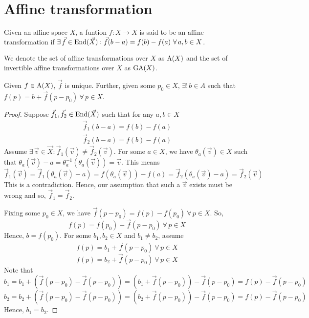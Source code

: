 \section{Affine transformation}

\begin{definition}
    Given an affine space $X$, a funtion $f: X \to X$ is said to be an affine
    transformation if $\exists\,\vec{f}\in\operatorname{End}(\vec{X}): \vec{f}(b-a)=f(b)-f(a)\ \forall\,a,b \in X$.
\end{definition}

\begin{notation}
    We denote the set of affine transformations over $X$ as $\operatorname{A}(X)$ and the set of
    invertible affine transformations over $X$ as $\operatorname{GA}(X)$.
\end{notation}

\begin{theorem} \label{thm:aff_lin_rep}
    Given $f\in\operatorname{A}(X)$, $\vec{f}$ is unique. Further, given some $p_0 \in X$,
    $\exists!\,b\in{A}$ such that $f(p)=b+\vec{f}(p-p_0)\ \forall\,p \in X$.
\end{theorem}

\begin{proof}
    Suppose $\vec{f}_1,\vec{f}_2\in\operatorname{End}(\vec{X})$ such that for any $a,b \in X$
    \begin{align*}
        \vec{f}_1(b-a)=f(b)-f(a) \\
        \vec{f}_2(b-a)=f(b)-f(a)
    \end{align*}
    Assume $\exists\,\vec{v}\in\vec{X}: \vec{f}_1(\vec{v})\neq\vec{f}_2(\vec{v})$.
    For some $a \in X$, we have $\theta_a(\vec{v}) \in X$ such that
    $\theta_a(\vec{v})-a=\theta_a^{-1}(\theta_a(\vec{v}))=\vec{v}$. This means
    \[
        \vec{f}_1(\vec{v}) = \vec{f}_1(\theta_a(\vec{v})-a)
        = f(\theta_a(\vec{v}))-f(a)
        = \vec{f}_2(\theta_a(\vec{v})-a)= \vec{f}_2(\vec{v})
    \]
    This is a contradiction. Hence, our assumption that such a $\vec{v}$ exists
    must be wrong and so, $\vec{f}_1=\vec{f}_2$.
    \vspace{1ex}

    \noindent
    Fixing some $p_0 \in X$, we have
    $\vec{f}(p-p_0)=f(p)-f(p_0)\ \forall\,p \in X$. So,
    \[ f(p)=f(p_0)+\vec{f}(p-p_0)\ \forall\,p \in X \]
    Hence, $b=f(p_0)$. For some $b_1,b_2 \in X$ and $b_1 \neq b_2$, assume
    \[ f(p)=b_1+\vec{f}(p-p_0)\ \forall\,p \in X \]
    \[ f(p)=b_2+\vec{f}(p-p_0)\ \forall\,p \in X \]
    Note that
    \[ b_1=b_1+(\vec{f}(p-p_0)-\vec{f}(p-p_0))=(b_1+\vec{f}(p-p_0))-\vec{f}(p-p_0)=f(p)-\vec{f}(p-p_0) \]
    \[ b_2=b_2+(\vec{f}(p-p_0)-\vec{f}(p-p_0))=(b_2+\vec{f}(p-p_0))-\vec{f}(p-p_0)=f(p)-\vec{f}(p-p_0) \]
    Hence, $b_1=b_2$.
\end{proof}

